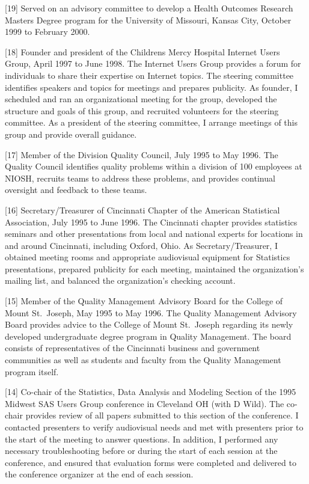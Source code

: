 \documentclass[
  12pt,
]{article}
\begin{document}
{[}19{]} Served on an advisory committee to develop a Health Outcomes
Research Masters Degree program for the University of Missouri, Kansas
City, October 1999 to February 2000.

{[}18{]} Founder and president of the Childrens Mercy Hospital Internet
Users Group, April 1997 to June 1998. The Internet Users Group provides
a forum for individuals to share their expertise on Internet topics. The
steering committee identifies speakers and topics for meetings and
prepares publicity. As founder, I scheduled and ran an organizational
meeting for the group, developed the structure and goals of this group,
and recruited volunteers for the steering committee. As a president of
the steering committee, I arrange meetings of this group and provide
overall guidance.

{[}17{]} Member of the Division Quality Council, July 1995 to May 1996.
The Quality Council identifies quality problems within a division of 100
employees at NIOSH, recruits teams to address these problems, and
provides continual oversight and feedback to these teams.

{[}16{]} Secretary/Treasurer of Cincinnati Chapter of the American
Statistical Association, July 1995 to June 1996. The Cincinnati chapter
provides statistics seminars and other presentations from local and
national experts for locations in and around Cincinnati, including
Oxford, Ohio. As Secretary/Treasurer, I obtained meeting rooms and
appropriate audiovisual equipment for Statistics presentations, prepared
publicity for each meeting, maintained the organization's mailing list,
and balanced the organization's checking account.

{[}15{]} Member of the Quality Management Advisory Board for the College
of Mount St.~Joseph, May 1995 to May 1996. The Quality Management
Advisory Board provides advice to the College of Mount St.~Joseph
regarding its newly developed undergraduate degree program in Quality
Management. The board consists of representatives of the Cincinnati
business and government communities as well as students and faculty from
the Quality Management program itself.

{[}14{]} Co-chair of the Statistics, Data Analysis and Modeling Section
of the 1995 Midwest SAS Users Group conference in Cleveland OH (with D
Wild). The co-chair provides review of all papers submitted to this
section of the conference. I contacted presenters to verify audiovisual
needs and met with presenters prior to the start of the meeting to
answer questions. In addition, I performed any necessary troubleshooting
before or during the start of each session at the conference, and
ensured that evaluation forms were completed and delivered to the
conference organizer at the end of each session.
\end{document}
